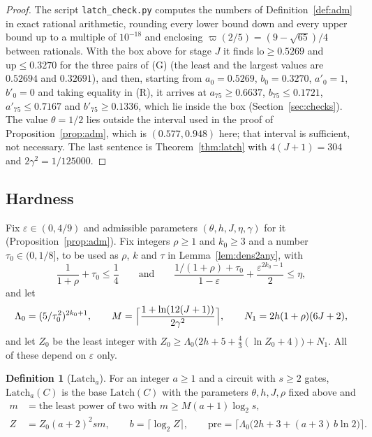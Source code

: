 \documentclass[11pt]{amsart}
\theoremstyle{definition}
\newtheorem{definition}[theorem]{Definition}
\theoremstyle{remark}
\newcommand{\eps}{\varepsilon}
\begin{document}
\begin{proof}
The script \texttt{latch\_check.py} computes the numbers of Definition~\ref{def:adm} in exact
rational arithmetic, rounding every lower bound down and every upper bound up to a multiple of
$10^{-18}$ and enclosing $\varpi(2/5)=(9-\sqrt{65})/4$ between rationals. With the box above for
stage $J$ it finds $\mathrm{lo}\ge0.5269$ and $\mathrm{up}\le0.3270$ for the three pairs of (G)
(the least and the largest values are $0.52694$ and $0.32691$), and then, starting from
$a_0=0.5269$, $b_0=0.3270$, $a'_0=1$, $b'_0=0$ and taking equality in (R), it arrives at
$a_{75}\ge0.6637$, $b_{75}\le0.1721$, $a'_{75}\le0.7167$ and $b'_{75}\ge0.1336$, which lie inside
the box (Section~\ref{sec:checks}). The value $\theta=1/2$ lies outside the interval used in the
proof of Proposition~\ref{prop:adm}, which is $(0.577,0.948)$ here; that interval is sufficient,
not necessary. The last sentence is Theorem~\ref{thm:latch} with $4(J+1)=304$ and
$2\gamma^2=1/125000$.
\end{proof}

\subsection{Hardness}

Fix $\eps\in(0,4/9)$ and admissible parameters $(\theta,h,J,\eta,\gamma)$ for it
(Proposition~\ref{prop:adm}). Fix integers $\rho\ge1$ and $k_0\ge3$ and a number
$\tau_0\in(0,1/8]$, to be used as $\rho$, $k$ and $\tau$ in Lemma~\ref{lem:dens2any}, with
\[
\frac1{1+\rho}+\tau_0\le\frac14\qquad\text{and}\qquad
\frac{1/(1+\rho)+\tau_0}{1-\eps}+\frac{\eps^{2k_0-1}}2\le\eta ,
\]
and let
\[
\Lambda_0=(5/\tau_0^2)^{2k_0+1},\qquad M=\Bigl\lceil\frac{1+\ln(12(J+1))}{2\gamma^2}\Bigr\rceil,\qquad
N_1=2h(1+\rho)(6J+2),
\]
and let $Z_0$ be the least integer with $Z_0\ge\Lambda_0\bigl(2h+5+\tfrac43(\ln Z_0+4)\bigr)+N_1$.
All of these depend on $\eps$ only.

\begin{definition}[$\mathrm{Latch}_a$]\label{def:latcha}
For an integer $a\ge1$ and a circuit with $s\ge2$ gates, $\mathrm{Latch}_a(C)$ is the base
$\mathrm{Latch}(C)$ with the parameters $\theta,h,J,\rho$ fixed above and
\begin{align*}
m&=\text{the least power of two with }m\ge M(a+1)\log_2s,\\
Z&=Z_0(a+2)^2sm,\qquad b=\lceil\log_2Z\rceil,\qquad
\mathrm{pre}=\bigl\lceil\Lambda_0\bigl(2h+3+(a+3)\,b\ln2\bigr)\bigr\rceil .
\end{align*}
\end{definition}
\end{document}
